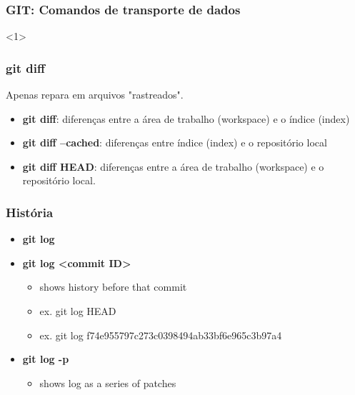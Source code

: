 \documentclass{beamer}
\begin{document}
\begin{frame}
\frametitle{GIT: Comandos de transporte de dados}

<1>

\end{frame}

\begin{frame}
\frametitle{git diff}


Apenas repara em arquivos "rastreados".

\begin{itemize}
\item \textbf{git diff}: diferenças entre a área de trabalho (workspace) e o índice (index)
\item \textbf{git diff --cached}: diferenças entre índice (index) e o repositório local
\item \textbf{git diff HEAD}: diferenças entre a área de trabalho (workspace) e o repositório local.
\end{itemize}
\end{frame}

\begin{frame}
\frametitle{História}

\begin{itemize}
\item \textbf{git log}
\item \textbf{git log <commit ID>}
\begin{itemize}
\item shows history before that commit
\item ex. git log HEAD
\item ex.  git log f74e955797c273c0398494ab33bf6e965c3b97a4
\end{itemize}
\item \textbf{git log -p}
\begin{itemize}
\item shows log as a series of patches
\end{itemize}
\end{itemize}

\end{frame}
\end{document}
